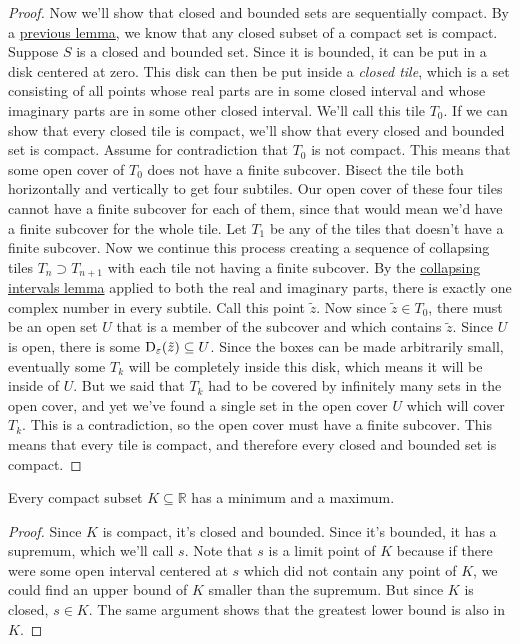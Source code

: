 \begin{proof}
Now we'll show that closed and bounded sets are sequentially compact. By a \hyperlink{Closed Subsets of Compact Sets}{previous lemma}, we know that any closed subset of a compact set is compact. Suppose $S$ is a closed and bounded set. Since it is bounded, it can be put in a disk centered at zero. This disk can then be put inside a \emph{closed tile}, which is a set consisting of all points whose real parts are in some closed interval and whose imaginary parts are in some other closed interval. We'll call this tile $T_0$. If we can show that every closed tile is compact, we'll show that every closed and bounded set is compact. Assume for contradiction that $T_0$ is not compact. This means that some open cover of $T_0$ does not have a finite subcover. Bisect the tile both horizontally and vertically to get four subtiles. Our open cover of these four tiles cannot have a finite subcover for each of them, since that would mean we'd have a finite subcover for the whole tile. Let $T_1$ be any of the tiles that doesn't have a finite subcover. Now we continue this process creating a sequence of collapsing tiles $T_n \supset T_{n+1}$ with each tile not having a finite subcover. By the \hyperlink{Collapsing Intervals Lemma}{collapsing intervals lemma} applied to both the real and imaginary parts, there is exactly one complex number in every subtile. Call this point $\tilde{z}$. Now since $\tilde{z} \in T_0$, there must be an open set $U$ that is a member of the subcover and which contains $\tilde{z}$. Since $U$ is open, there is some $\operatorname{D_{\varepsilon}} ({\tilde{z}}) \subseteq U$. Since the boxes can be made arbitrarily small, eventually some $T_k$ will be completely inside this disk, which means it will be inside of $U$. But we said that $T_k$ had to be covered by infinitely many sets in the open cover, and yet we've found a single set in the open cover $U$ which will cover $T_k$. This is a contradiction, so the open cover must have a finite subcover. This means that every tile is compact, and therefore every closed and bounded set is compact.
\end{proof}
\begin{corollary}
Every compact subset $K \subseteq \mathbb{R}$ has a minimum and a maximum.
\end{corollary}
\begin{proof}
Since $K$ is compact, it's closed and bounded. Since it's bounded, it has a supremum, which we'll call $s$. Note that $s$ is a limit point of $K$ because if there were some open interval centered at $s$ which did not contain any point of $K$, we could find an upper bound of $K$ smaller than the supremum. But since $K$ is closed, $s \in K$. The same argument shows that the greatest lower bound is also in $K$.
\end{proof}

